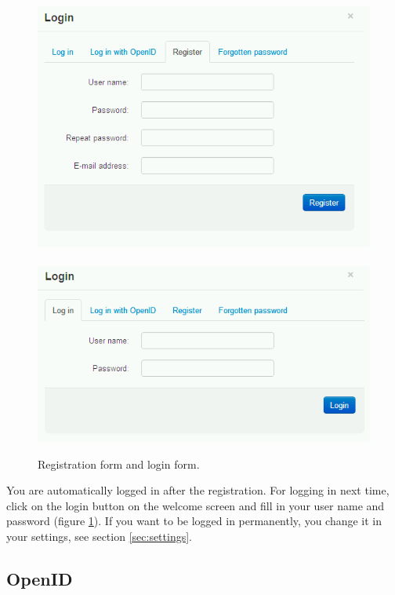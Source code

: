 \begin{figure}[h]
\begin{center}
\includegraphics[scale=0.4]{figures/user_manual/register.png}~~~~\includegraphics[scale=0.4]{figures/user_manual/login.png}
\end{center}
\caption{Registration form and login form.}
\label{fig:register_login}
\end{figure}

You are automatically logged in after the registration. For logging in next time, click on the login button on the welcome screen and fill in your user name and password (figure \ref{fig:register_login}). If you want to be logged in permanently, you change it in your settings, see section \ref{sec:settings}.

\subsection{OpenID}

